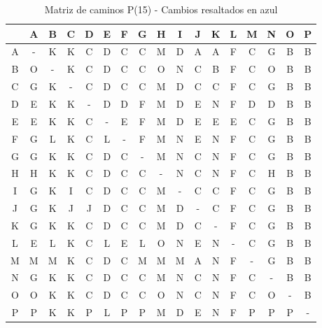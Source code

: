 \documentclass[12pt]{article}
\begin{document}
\begin{table}[h!]
\centering
\begin{tabular}{|c|c|c|c|c|c|c|c|c|c|c|c|c|c|c|c|c|}
\hline
 & A & B & C & D & E & F & G & H & I & J & K & L & M & N & O & P \\\hline
A & - & K & K & C & D & C & C & M & D & A & A & F & C & G & B & B \\\hline
B & \cellcolor{lightblue} O & - & K & C & D & C & C & \cellcolor{lightblue} O & \cellcolor{lightblue} N & C & B & F & C & \cellcolor{lightblue} O & B & B \\\hline
C & G & K & - & C & D & C & C & M & D & C & C & F & C & G & B & B \\\hline
D & E & K & K & - & D & D & F & M & D & E & N & F & D & D & B & B \\\hline
E & E & K & K & C & - & E & F & M & D & E & E & E & C & G & B & B \\\hline
F & G & L & K & C & L & - & F & M & N & E & N & F & C & G & B & B \\\hline
G & G & K & K & C & D & C & - & M & N & C & N & F & C & G & B & B \\\hline
H & H & K & K & C & D & C & C & - & N & C & N & F & C & H & B & B \\\hline
I & G & K & I & C & D & C & C & M & - & C & C & F & C & G & B & B \\\hline
J & G & K & J & J & D & C & C & M & D & - & C & F & C & G & B & B \\\hline
K & G & K & K & C & D & C & C & M & D & C & - & F & C & G & B & B \\\hline
L & E & L & K & C & L & E & L & \cellcolor{lightblue} O & N & E & N & - & C & G & B & B \\\hline
M & M & M & K & C & D & C & M & M & M & A & N & F & - & G & B & B \\\hline
N & G & K & K & C & D & C & C & M & N & C & N & F & C & - & B & B \\\hline
O & O & K & K & C & D & C & C & O & N & C & N & F & C & O & - & B \\\hline
P & P & K & K & P & L & P & P & M & D & E & N & F & P & P & P & - \\\hline
\end{tabular}
\caption{Matriz de caminos P(15) - Cambios resaltados en azul}
\end{table}
\end{document}
